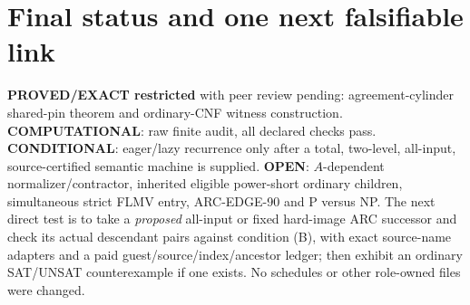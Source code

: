 \documentclass[11pt]{article}
\begin{document}
\section{Final status and one next falsifiable link}
\textbf{PROVED/EXACT restricted} with peer review pending:
agreement-cylinder shared-pin theorem and ordinary-CNF
witness construction. \textbf{COMPUTATIONAL}: raw finite
audit, all declared checks pass. \textbf{CONDITIONAL}:
eager/lazy recurrence only after a total, two-level,
all-input, source-certified semantic machine is supplied.
\textbf{OPEN}: $A$-dependent normalizer/contractor, inherited
eligible power-short ordinary children, simultaneous strict
FLMV entry, ARC-EDGE-90 and P versus NP.
The next direct test is to take a \emph{proposed} all-input or
fixed hard-image ARC successor and check its actual descendant
pairs against condition (B), with exact source-name adapters
and a paid guest/source/index/ancestor ledger; then exhibit an
ordinary SAT/UNSAT counterexample if one exists.
No schedules or other role-owned files were changed.
\end{document}
